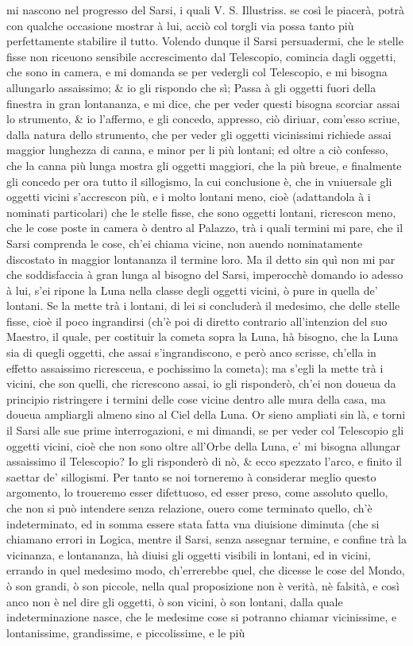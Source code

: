 \documentclass[11pt,twoside,openany]{book}
\begin{document}
mi nascono nel progresso del Sarsi, i quali V. S. Illustriss. se così le piacerà, potrà con qualche occasione mostrar à lui, acciò col torgli via possa tanto più perfettamente stabilire il tutto. Volendo dunque il Sarsi persuadermi, che le stelle fisse non riceuono sensibile accrescimento dal Telescopio, comincia dagli oggetti, che sono in camera, e mi domanda se per vedergli col Telescopio, e mi bisogna allungarlo assaissimo; \& io gli rispondo che sì; Passa à gli oggetti fuori della finestra in gran lontananza, e mi dice, che per veder questi bisogna scorciar assai lo strumento, \& io l'affermo, e gli concedo, appresso, ciò diriuar, com'esso scriue, dalla natura dello strumento, che per veder gli oggetti vicinissimi richiede assai maggior lunghezza di canna, e minor per li più lontani; ed oltre a ciò confesso, che la canna più lunga mostra gli oggetti maggiori, che la più breue, e finalmente gli concedo per ora tutto il sillogismo, la cui conclusione è, che in vniuersale gli oggetti vicini s'accrescon più, e i molto lontani meno, cioè (adattandola à i nominati particolari) che le stelle fisse, che sono oggetti lontani, ricrescon meno, che le cose poste in camera ò dentro al Palazzo, trà i quali termini mi pare, che il Sarsi comprenda le cose, ch'ei chiama vicine, non auendo nominatamente discostato in maggior lontananza il termine loro. Ma il detto sin quì non mi par che soddisfaccia à gran lunga al bisogno del Sarsi, imperocchè domando io adesso à lui, s'ei ripone la Luna nella classe degli oggetti vicini, ò pure in quella de' lontani. Se la mette trà i lontani, di lei si concluderà il medesimo, che delle stelle fisse, cioè il poco ingrandirsi (ch'è poi di diretto contrario all'intenzion del suo Maestro, il quale, per costituir la cometa sopra la Luna, hà bisogno, che la Luna sia di quegli oggetti, che assai s'ingrandiscono, e però anco scrisse, ch'ella in effetto assaissimo ricresceua, e pochissimo la cometa); ma s'egli la mette trà i vicini, che son quelli, che ricrescono assai, io gli risponderò, ch'ei non doueua da principio ristringere i termini delle cose vicine dentro alle mura della casa, ma doueua ampliargli almeno sino al Ciel della Luna. Or sieno ampliati sin là, e torni il Sarsi alle sue prime interrogazioni, e mi dimandi, se per veder col Telescopio gli oggetti vicini, cioè che non sono oltre all'Orbe della Luna, e' mi bisogna allungar assaissimo il Telescopio? Io gli risponderò di nò, \& ecco spezzato l'arco, e finito il saettar de' sillogismi. Per tanto se noi torneremo à considerar meglio questo argomento, lo troueremo esser difettuoso, ed esser preso, come assoluto quello, che non si può intendere senza relazione, ouero come terminato quello, ch'è indeterminato, ed in somma essere stata fatta vna diuisione diminuta (che si chiamano errori in Logica, mentre il Sarsi, senza assegnar termine, e confine trà la vicinanza, e lontananza, hà diuisi gli oggetti visibili in lontani, ed in vicini, errando in quel medesimo modo, ch'errerebbe quel, che dicesse le cose del Mondo, ò son grandi, ò son piccole, nella qual proposizione non è verità, nè falsità, e così anco non è nel dire gli oggetti, ò son vicini, ò son lontani, dalla quale indeterminazione nasce, che le medesime cose si potranno chiamar vicinissime, e lontanissime, grandissime, e piccolissime, e le più 
\end{document}

